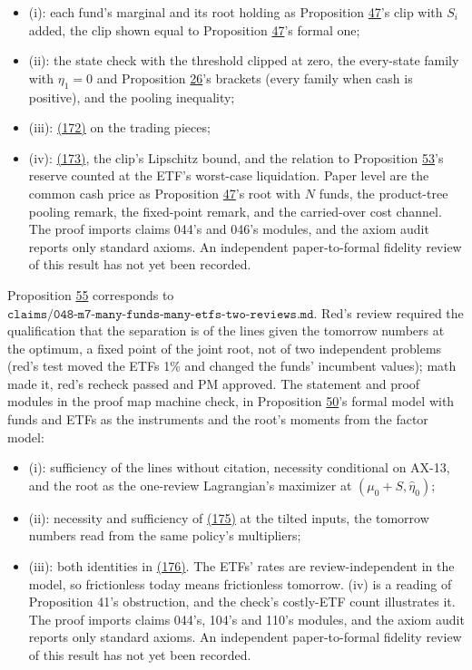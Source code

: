 \documentclass[11pt]{article}
\begin{document}
\begin{itemize}
  \item (i): each fund's marginal and its root holding as Proposition \hyperref[res:Proposition-47]{47}'s
  clip with \(S_i\) added, the clip shown equal to Proposition \hyperref[res:Proposition-47]{47}'s formal
  one;
  \item (ii): the state check with the threshold clipped at zero, the
  every-state family with \(\eta_1=0\) and Proposition \hyperref[res:Proposition-26]{26}'s brackets (every
  family when cash is positive), and the pooling inequality;
  \item (iii): \hyperref[eq:172]{(172)} on the trading pieces;
  \item (iv): \hyperref[eq:173]{(173)}, the clip's Lipschitz bound, and the relation to
  Proposition \hyperref[res:Proposition-53]{53}'s reserve counted at the ETF's worst-case liquidation.
Paper level are the common cash price as Proposition \hyperref[res:Proposition-47]{47}'s root with \(N\)
funds, the product-tree pooling remark, the fixed-point remark, and the
carried-over cost channel. The proof imports claims 044's and 046's
modules, and the axiom audit reports only standard axioms. An
independent paper-to-formal fidelity review of this result has not
yet been recorded.
\end{itemize}

Proposition \hyperref[res:Proposition-55]{55} corresponds to
\(\texttt{claims/048-m7-many-funds-many-etfs-two-reviews.md}\). Red's review required
the qualification that the separation is of the lines given the
tomorrow numbers at the optimum, a fixed point of the joint root, not
of two independent problems (red's test moved the ETFs 1\% and changed
the funds' incumbent values); math made it, red's recheck passed and PM
approved. The statement and proof modules in the proof map machine
check, in Proposition \hyperref[res:Proposition-50]{50}'s formal model with funds and ETFs as the
instruments and the root's moments from the factor model:

\begin{itemize}
  \item (i): sufficiency of the lines without citation, necessity conditional
  on AX-13, and the root as the one-review Lagrangian's maximizer at
  \((\mu_0+S,\hat\eta_0)\);
  \item (ii): necessity and sufficiency of \hyperref[eq:175]{(175)} at the tilted inputs, the
  tomorrow numbers read from the same policy's multipliers;
  \item (iii): both identities in \hyperref[eq:176]{(176)}.
The ETFs' rates are review-independent in the model, so frictionless
today means frictionless tomorrow. (iv) is a reading of Proposition
41's obstruction, and the check's costly-ETF count illustrates it. The
proof imports claims 044's, 104's and 110's modules, and the axiom audit
reports only standard axioms. An independent paper-to-formal fidelity
review of this result has not yet been recorded.
\end{itemize}
\end{document}
